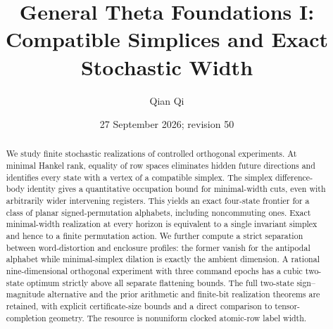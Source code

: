 \documentclass[11pt]{amsart}
\title[Compatible simplices and stochastic width]{General Theta Foundations I: \\
Compatible Simplices and Exact Stochastic Width}
\author{Qian Qi}
\date{27 September 2026; revision 50}
\numberwithin{equation}{section}
\theoremstyle{definition}\newtheorem{definition}[theorem]{Definition}
\begin{document}
\begin{abstract}
We study finite stochastic realizations of controlled orthogonal
experiments. At minimal Hankel rank, equality of row spaces eliminates
hidden future directions and identifies every state with a vertex of a
compatible simplex. The simplex difference-body identity gives a
quantitative occupation bound for minimal-width cuts, even with
arbitrarily wider intervening registers. This yields an exact four-state
frontier for a class of planar signed-permutation alphabets, including
noncommuting ones. Exact minimal-width realization at every horizon is
equivalent to a single invariant simplex and hence to a finite
permutation action. We further compute a strict separation between
word-distortion and enclosure profiles: the former vanish for the
antipodal alphabet while minimal-simplex dilation is exactly the
ambient dimension. A rational nine-dimensional orthogonal experiment
with three command epochs has a cubic two-state optimum strictly above
all separate flattening bounds. The full two-state sign--magnitude
alternative and the prior arithmetic and finite-bit realization
theorems are retained, with explicit certificate-size bounds and a
direct comparison to tensor-completion geometry. The resource is
nonuniform clocked atomic-row label width.
\end{abstract}
\maketitle






















\end{document}
